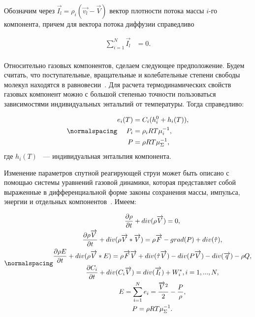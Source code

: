 Обозначим через $\overrightarrow{I_l} = \rho_i(\overrightarrow{v_l} - \overrightarrow{V})$ вектор плотности потока массы $i$-го  компонента, причем для вектора потока диффузии справедливо

\begin{equation}
\begin{split}
\sum_{i = 1}^{N}\overrightarrow{I_l} &= 0. \\
\end{split}
\end{equation}

Относительно газовых компонентов, сделаем следующее предположение. Будем считать, что поступательные, вращательные и колебательные степени свободы молекул находятся в равновесии~\cite{book3}. Для расчета термодинамических свойств газовых компонент можно с большой степенью точности пользоваться зависимостями индивидуальных энтальпий от температуры. Тогда справедливо:

\begin{equation}
\normalspacing
\begin{split}
e_i(T) &= C_i(h_i^0 + h_i(T)), \\
P_i &= \rho_i RT\mu_i^{-1}, \\
P &= \rho RT\mu_\Sigma^{-1},
\end{split}
\end{equation}
где $h_i(T)$ ~--- индивидуальная энтальпия компонента.

Изменение параметров спутной реагирующей струи может быть описано с помощью системы уравнений газовой динамики, которая представляет собой выраженные в дифференциальной форме законы сохранения массы, импульса, энергии и отдельных компонентов~\cite{book1_tur, book2_tur, book3_tur, book4_tur, book5_tur, book6_tur, book7_tur, book8_tur, book9_tur}. Имеем:

\begin{equation}
\normalspacing
\begin{gathered}
\frac{\partial \rho}{\partial t} + div(\rho \overrightarrow{V}) = 0, \\
\frac{\partial \rho \overrightarrow{V}}{\partial t} + div(\rho \overrightarrow{V} * \overrightarrow{V}) = \rho \overrightarrow{F} - grad(P) + div(\hat{\tau}), \\
\frac{\partial \rho E}{\partial t} + div(\rho \overrightarrow{V} * E) = \rho \overrightarrow{F} \overrightarrow{V} + div(\hat{\tau}\overrightarrow{V}) - div(P\overrightarrow{V}) - div(\overrightarrow{q}) - \rho Q, \\
\frac{\partial C_i}{\partial t} + div(C_i \overrightarrow{V}) = div(\overrightarrow{I_l}) + W_i^*, i = 1,...,N, \\
E = \sum_{i = 1}^{N}e_i = \frac{\overrightarrow{V}^2}{2} - \frac{P}{\rho}, \\
P = \rho RT \mu_\Sigma^{-1}.
\end{gathered}
\end{equation}

